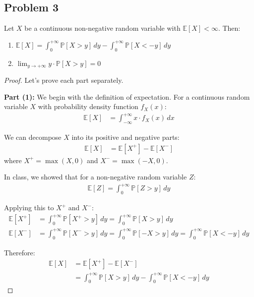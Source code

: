 \subsection*{Problem 3}
    Let $X$ be a continuous non-negative random variable with $\mathbb{E}[X] < \infty$. Then:
    \begin{enumerate}
        \item $\displaystyle \mathbb{E}[X] = \int_0^{+\infty} \mathbb{P}[X > y] \, dy - \int_0^{+\infty} \mathbb{P}[X <- y] \, dy$
        \item $\displaystyle \lim_{y \to +\infty} y \cdot \mathbb{P}[X > y] = 0$
    \end{enumerate}
    \begin{proof}
        Let's prove each part separately.
        
        \textbf{Part (1):} We begin with the definition of expectation. For a continuous random variable $X$ with probability density function $f_X(x)$:
        \begin{align*}
        \mathbb{E}[X] &= \int_{-\infty}^{+\infty} x \cdot f_X(x) \, dx
        \end{align*}
        
        We can decompose $X$ into its positive and negative parts:
        \begin{align*}
        \mathbb{E}[X] &= \mathbb{E}[X^+] - \mathbb{E}[X^-]
        \end{align*}
        where $X^+ = \max(X, 0)$ and $X^- = \max(-X, 0)$.
        
        In class, we showed that for a non-negative random variable $Z$:
        \begin{align*}
        \mathbb{E}[Z] = \int_0^{+\infty} \mathbb{P}[Z > y] \, dy
        \end{align*}
        
        Applying this to $X^+$ and $X^-$:
        \begin{align*}
        \mathbb{E}[X^+] &= \int_0^{+\infty} \mathbb{P}[X^+ > y] \, dy = \int_0^{+\infty} \mathbb{P}[X > y] \, dy\\
        \mathbb{E}[X^-] &= \int_0^{+\infty} \mathbb{P}[X^- > y] \, dy = \int_0^{+\infty} \mathbb{P}[-X > y] \, dy = \int_0^{+\infty} \mathbb{P}[X < -y] \, dy
        \end{align*}
        
        Therefore:
        \begin{align*}
        \mathbb{E}[X] &= \mathbb{E}[X^+] - \mathbb{E}[X^-]\\
        &= \int_0^{+\infty} \mathbb{P}[X > y] \, dy - \int_0^{+\infty} \mathbb{P}[X < -y] \, dy
        \end{align*}
        

\end{proof}
